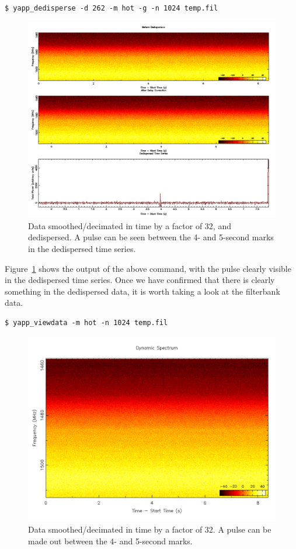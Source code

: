 \documentclass{article}
\begin{document}
\small{
\begin{verbatim}
$ yapp_dedisperse -d 262 -m hot -g -n 1024 temp.fil
\end{verbatim}
}

\begin{figure}[h]
\includegraphics[width=\textwidth]{dd_tsnofs.png}
\caption{Data smoothed/decimated in time by a factor of 32, and dedispersed.
    A pulse can be seen between the 4- and 5-second marks in the dedispersed
    time series.
    \label{fig_dd_tsnofs}}
\end{figure}

Figure~\ref{fig_dd_tsnofs} shows the output of the above command, with the
pulse clearly visible in the dedispersed time series. Once we have confirmed
that there is clearly something in the dedispersed data, it is worth taking a
look at the filterbank data.

\small{
\begin{verbatim}
$ yapp_viewdata -m hot -n 1024 temp.fil
\end{verbatim}
}

\begin{figure}[h]
\includegraphics[width=\textwidth]{fb_tsnofs.png}
\caption{Data smoothed/decimated in time by a factor of 32. A pulse can be made
    out between the 4- and 5-second marks.
    \label{fig_fb_tsnofs}}
\end{figure}
\end{document}
